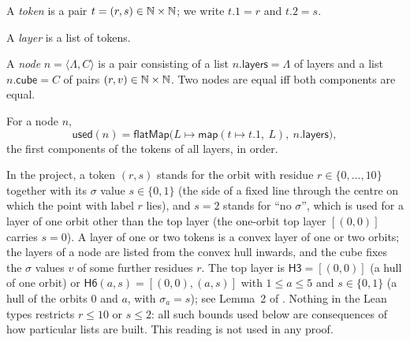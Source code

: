 \begin{definition}\label{cb:def:tok}
A \emph{token} is a pair $t=(r,s)\in\mathbb N\times\mathbb N$; we write $t.1=r$ and $t.2=s$.
\end{definition}

\begin{definition}\label{cb:def:layer}
A \emph{layer} is a list of tokens.
\end{definition}

\begin{definition}\label{cb:def:node}
A \emph{node} $n=\langle\Lambda,C\rangle$ is a pair consisting of a list $n.\mathsf{layers}=\Lambda$ of layers and a
list $n.\mathsf{cube}=C$ of pairs $(r,v)\in\mathbb N\times\mathbb N$. Two nodes are equal iff both components are equal.
\end{definition}

\begin{definition}\label{cb:def:used}
For a node $n$,
\[
\mathsf{used}(n)=\mathsf{flatMap}\big(L\mapsto\mathsf{map}(t\mapsto t.1,\ L),\ n.\mathsf{layers}\big),
\]
the first components of the tokens of all layers, in order.
\end{definition}

\begin{remark}\label{cb:rem:reading}
In the project, a token $(r,s)$ stands for the orbit with residue $r\in\{0,\dots,10\}$ together with its $\sigma$
value $s\in\{0,1\}$ (the side of a fixed line through the centre on which the point with label $r$ lies), and $s=2$
stands for ``no $\sigma$'', which is used for a layer of one orbit other than the top layer (the one-orbit top
layer $[(0,0)]$ carries $s=0$). A layer of one or two tokens is a convex layer of
one or two orbits; the layers of a node are listed from the convex hull inwards, and the cube fixes the $\sigma$ values
$v$ of some further residues $r$. The top layer is $\mathsf{H3}=[(0,0)]$ (a hull of one orbit) or
$\mathsf{H6}(a,s)=[(0,0),(a,s)]$ with $1\le a\le5$ and $s\in\{0,1\}$ (a hull of the orbits $0$ and $a$, with
$\sigma_a=s$); see Lemma~2 of . Nothing in the Lean types restricts $r\le10$ or $s\le2$: all such
bounds used below are consequences of how particular lists are built. This reading is not used in any proof.
\end{remark}


